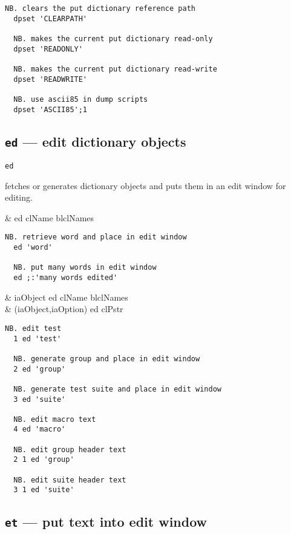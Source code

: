 \begin{lstlisting}[frame=single,framerule=0pt]
  NB. clears the put dictionary reference path
  dpset 'CLEARPATH'  
  
  NB. makes the current put dictionary read-only 
  dpset 'READONLY'    
  
  NB. makes the current put dictionary read-write
  dpset 'READWRITE'   
  
  NB. use ascii85 in dump scripts 
  dpset 'ASCII85';1    
\end{lstlisting}


\subsection{\texttt{ed} --- edit dictionary objects}\label{ss:ed}

\hypertarget{il:ed}{\texttt{ed}} fetches or generates dictionary objects and puts 
them in an edit window for editing.

\begin{wordhead}
\monad & ed clName \argsep blclNames \\
\end{wordhead}
\begin{lstlisting}[frame=single,framerule=0pt]
  NB. retrieve word and place in edit window
  ed 'word'
  
  NB. put many words in edit window 
  ed ;:'many words edited' 
\end{lstlisting} 

\begin{wordhead}
\dyad & iaObject ed clName \argsep blclNames \\
      & (iaObject,iaOption) ed clPstr \\
\end{wordhead}
\begin{lstlisting}[frame=single,framerule=0pt]      
  NB. edit test
  1 ed 'test'
  
  NB. generate group and place in edit window    
  2 ed 'group'  
   
  NB. generate test suite and place in edit window
  3 ed 'suite'  
  
  NB. edit macro text 
  4 ed 'macro'  
   
  NB. edit group header text
  2 1 ed 'group' 
  
  NB. edit suite header text
  3 1 ed 'suite'  
\end{lstlisting}

\subsection{\texttt{et} --- put text into edit window}\label{ss:et} 


